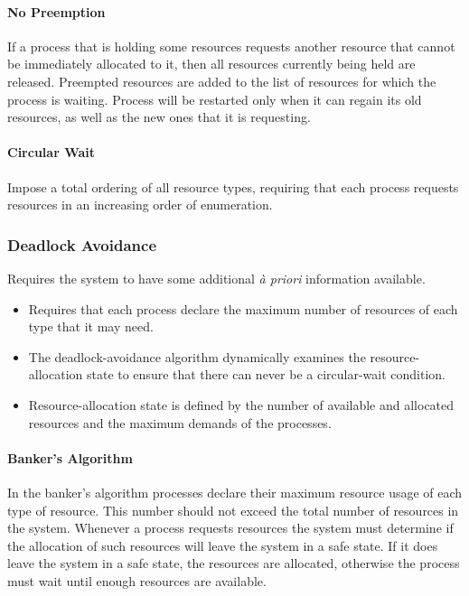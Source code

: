 \paragraph{No Preemption}
If a process that is holding some resources requests another resource that cannot be immediately allocated to it,
then all resources currently being held are released.
Preempted resources are added to the list of resources for which the process is waiting.
Process will be restarted only when it can regain its old resources, as well as the new ones that it is requesting.

\paragraph{Circular Wait}
Impose a total ordering of all resource types, requiring that each process requests resources in an increasing order of enumeration.

\subsubsection{Deadlock Avoidance}

Requires the system to have some additional \textit{à priori} information available.
\begin{itemize}
    \item Requires that each process declare the maximum number of resources of each type that it may need.
    \item The deadlock-avoidance algorithm dynamically examines the resource-allocation state to ensure that there can never be a circular-wait condition.
    \item Resource-allocation state is defined by the number of available and allocated resources and the maximum demands of the processes.
\end{itemize}

\paragraph{Banker's Algorithm}
In the banker's algorithm processes declare their maximum resource usage of each type of resource.
This number should not exceed the total number of resources in the system.
Whenever a process requests resources the system must determine if the allocation of such resources will leave the system in a safe state.
If it does leave the system in a safe state, the resources are allocated, otherwise the process must wait until enough resources are available.

